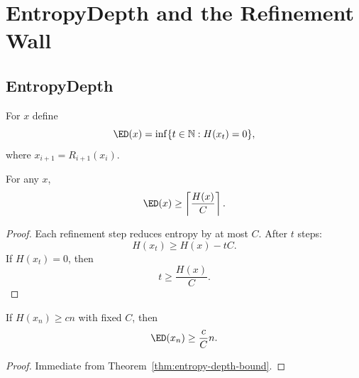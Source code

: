 \chapter{EntropyDepth and the Refinement Wall}

\section{EntropyDepth}

\begin{definition}[EntropyDepth]
For $x$ define
\[
\ED(x)
=
\inf
\{ t \in \mathbb{N} : H(x_t)=0 \},
\]
where $x_{i+1}=R_{i+1}(x_i)$.
\end{definition}

\begin{theorem}
For any $x$,
\[
\ED(x)
\ge
\left\lceil
\frac{H(x)}{C}
\right\rceil.
\]
\end{theorem}

\begin{proof}
Each refinement step reduces entropy by at most $C$.
After $t$ steps:
\[
H(x_t) \ge H(x) - tC.
\]
If $H(x_t)=0$, then
\[
t \ge \frac{H(x)}{C}.
\]
\end{proof}

\begin{theorem}
If $H(x_n) \ge c n$ with fixed $C$, then
\[
\ED(x_n) \ge \frac{c}{C} n.
\]
\end{theorem}

\begin{proof}
Immediate from Theorem~\ref{thm:entropy-depth-bound}.
\end{proof}
